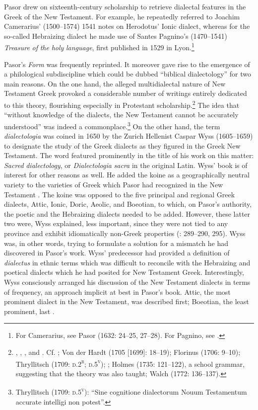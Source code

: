 \documentclass[output=paper]{langsci/langscibook}
\begin{document}
Pasor drew on sixteenth-century scholarship to retrieve dialectal features in the Greek of the New Testament. For example, he repeatedly referred to Joachim Camerarius’ (1500–1574) 1541 notes on Herodotus’ Ionic dialect, whereas for the so-called Hebraizing dialect he made use of Santes Pagnino’s (1470–1541) \textit{Treasure} \textit{of} \textit{the} \textit{holy} \textit{language}, first published in 1529 in Lyon.\footnote{For Camerarius, see Pasor (1632: 24–25, 27–28). For Pagnino, see \citet[36]{Pasor1632}.}

Pasor’s \textit{Form} was frequently reprinted. It moreover gave rise to the emergence of a philological subdiscipline which could be dubbed “biblical dialectology” for two main reasons. On the one hand, the alleged multidialectal nature of New Testament Greek provoked a considerable number of writings entirely dedicated to this theory, flourishing especially in Protestant scholarship.\footnote{\citet{Wyss1650}, \citet{Olearius1668}, \citet{Leusden1670}, and \citet{Nibbe1755}. Cf. \citet[347]{Parr1686}; Von der Hardt (1705 [1699]: 18–19); Florinus (1706: 9–10); Thryllitsch (1709: \textsc{d.2}\textsc{\textsuperscript{r}}; \textsc{d.5}\textsc{\textsuperscript{v}}); \citet[18]{Reinhard1724}; Holmes (1735: 121–122), a school grammar, suggesting that the theory was also taught; Walch (1772: 136–137).} The idea that “without knowledge of the dialects, the New Testament cannot be accurately understood” was indeed a commonplace.\footnote{Thryllitsch (1709: \textsc{d.5}\textsc{\textsuperscript{v}}): “Sine cognitione dialectorum Nouum Testamentum accurate intelligi non potest”.} On the other hand, the term \textit{dialectologia} was coined in 1650 by the Zurich Hellenist Caspar Wyss (1605–1659) to designate the study of the Greek dialects as they figured in the Greek New Testament. The word featured prominently in the title of his work on this matter: \textit{Sacred} \textit{dialectology}, or \textit{Dialectologia} \textit{sacra} in the original Latin. Wyss’ book is of interest for other reasons as well. He added the koine as a geographically neutral variety to the varieties of Greek which Pasor had recognized in the New Testament \citep[3]{Wyss1650}. The koine was opposed to the five principal and regional Greek dialects, Attic, Ionic, Doric, Aeolic, and Boeotian, to which, on Pasor’s authority, the poetic and the Hebraizing dialects needed to be added. However, these latter two were, Wyss explained, less important, since they were not tied to any province and exhibit idiomatically non-Greek properties (\citealt{Wyss1650}: 289–290, 295). Wyss was, in other words, trying to formulate a solution for a mismatch he had discovered in Pasor’s work. Wyss’ predecessor had provided a definition of \textit{dialectus} in ethnic terms which was difficult to reconcile with the Hebraizing and poetical dialects which he had posited for New Testament Greek. Interestingly, Wyss consciously arranged his discussion of the New Testament dialects in terms of frequency, an approach implicit at best in Pasor’s book. Attic, the most prominent dialect in the New Testament, was described first; Boeotian, the least prominent, last \citep[4]{Wyss1650}.
\end{document}
